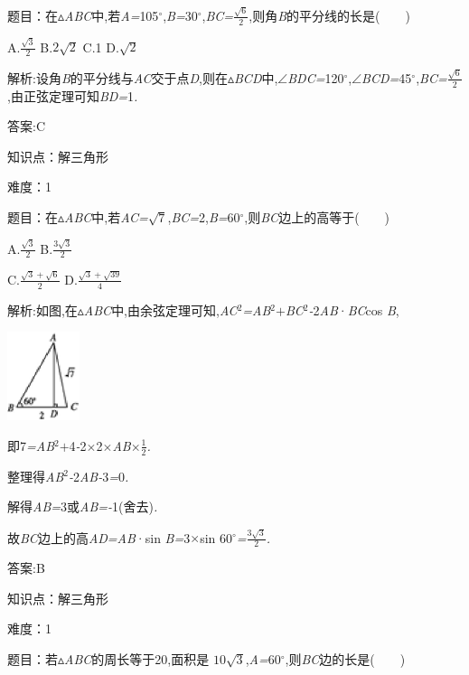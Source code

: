 \documentclass{article} %
\begin{document}
 题目：在$\mathrm{\vartriangle}$\textit{ABC}中,若\textit{A=}105$\mathrm{{}^\circ}$,\textit{B=}30$\mathrm{{}^\circ}$,\textit{BC=}$\frac{\sqrt{6}}{2}$,则角\textit{B}的平分线的长是(\textit{　　})

 

 A.$\frac{\sqrt{3}}{2}$ B.$2\sqrt{2}$ C.1 D.$\sqrt{2}$

 解析:设角\textit{B}的平分线与\textit{AC}交于点\textit{D},则在$\mathrm{\vartriangle}$\textit{BCD}中,$\mathrm{\angle}$\textit{BDC=}120$\mathrm{{}^\circ}$,$\mathrm{\angle}$\textit{BCD=}45$\mathrm{{}^\circ}$,\textit{BC=}$\frac{\sqrt{6}}{2}$,由正弦定理可知\textit{BD=}1\textit{.}

 答案:C

知识点：解三角形

难度：1

 题目：在$\mathrm{\vartriangle}$\textit{ABC}中,若\textit{AC=}$\sqrt{7}$,\textit{BC=}2,\textit{B=}60$\mathrm{{}^\circ}$,则\textit{BC}边上的高等于(\textit{　　})

 A.$\frac{\sqrt{3}}{2}$ B.$\frac{3\sqrt{3}}{2}$

 C.$\frac{\sqrt{3}+\sqrt{6}}{2}$ D.$\frac{\sqrt{3}+\sqrt{39}}{4}$

 解析:如图,在$\mathrm{\vartriangle}$\textit{ABC}中,由余弦定理可知,\textit{AC}${}^{2}$\textit{=AB}${}^{2}$\textit{$+$BC}${}^{2}$\textit{-}2\textit{AB}·\textit{BC}cos \textit{B},

 \includegraphics*[width=0.83in, height=1.02in, keepaspectratio=false]{image962}

即7\textit{=AB}${}^{2}$\textit{$+$}4\textit{-}2\textit{$\times$}2\textit{$\times$AB$\times$}$\frac{1}{2}$\textit{.}

整理得\textit{AB}${}^{2}$\textit{-}2\textit{AB-}3\textit{=}0\textit{.}

解得\textit{AB=}3或\textit{AB=-}1(舍去)\textit{.}

故\textit{BC}边上的高\textit{AD=AB}·sin \textit{B=}3\textit{$\times$}sin 60$\mathrm{{}^\circ}$\textit{=}$\frac{3\sqrt{3}}{2}$\textit{.}

 答案:B

知识点：解三角形

难度：1

 题目：若$\mathrm{\vartriangle}$\textit{ABC}的周长等于20,面积是 $10\sqrt{3}$,\textit{A=}60$\mathrm{{}^\circ}$,则\textit{BC}边的长是(\textit{　　})
\end{document}
